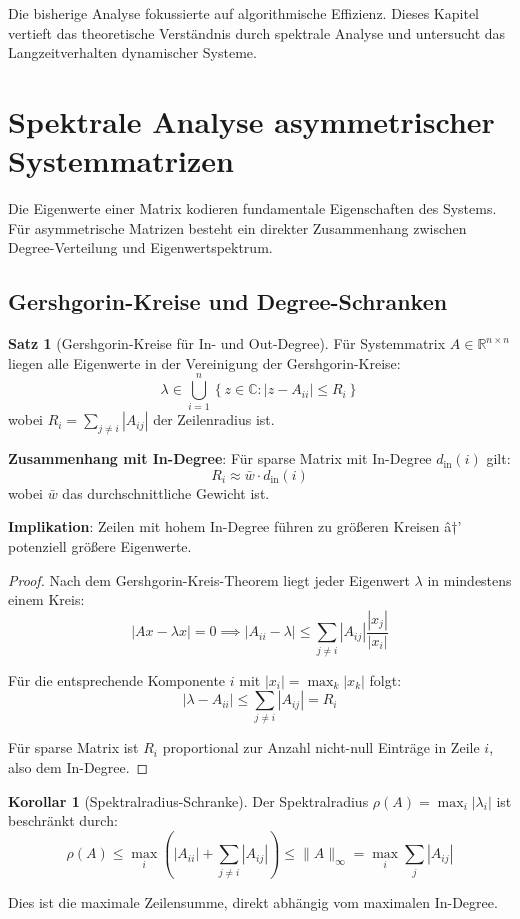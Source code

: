 ﻿\documentclass[a4paper,12pt]{report}
\theoremstyle{definition}
\newtheorem{satz}{Satz}
\newtheorem{korollar}{Korollar}
\begin{document}
	Die bisherige Analyse fokussierte auf algorithmische Effizienz. Dieses Kapitel vertieft das theoretische Verständnis durch spektrale Analyse und untersucht das Langzeitverhalten dynamischer Systeme.
	
	\section{Spektrale Analyse asymmetrischer Systemmatrizen}
	
	Die Eigenwerte einer Matrix kodieren fundamentale Eigenschaften des Systems. Für asymmetrische Matrizen besteht ein direkter Zusammenhang zwischen Degree-Verteilung und Eigenwertspektrum.
	
	\subsection{Gershgorin-Kreise und Degree-Schranken}
	
	\begin{satz}[Gershgorin-Kreise für In- und Out-Degree]
		Für Systemmatrix $A \in \mathbb{R}^{n \times n}$ liegen alle Eigenwerte in der Vereinigung der Gershgorin-Kreise:
		\[
		\lambda \in \bigcup_{i=1}^n \left\{ z \in \mathbb{C} : |z - A_{ii}| \leq R_i \right\}
		\]
		wobei $R_i = \sum_{j \neq i} |A_{ij}|$ der Zeilenradius ist.
		
		\textbf{Zusammenhang mit In-Degree}:
		Für sparse Matrix mit In-Degree $d_{\text{in}}(i)$ gilt:
		\[
		R_i \approx \bar{w} \cdot d_{\text{in}}(i)
		\]
		wobei $\bar{w}$ das durchschnittliche Gewicht ist.
		
		\textbf{Implikation}: Zeilen mit hohem In-Degree führen zu größeren Kreisen â†’ potenziell größere Eigenwerte.
	\end{satz}
	
	\begin{proof}
		Nach dem Gershgorin-Kreis-Theorem liegt jeder Eigenwert $\lambda$ in mindestens einem Kreis:
		\[
		|Ax - \lambda x| = 0 \implies |A_{ii} - \lambda| \leq \sum_{j \neq i} |A_{ij}| \frac{|x_j|}{|x_i|}
		\]
		
		Für die entsprechende Komponente $i$ mit $|x_i| = \max_k |x_k|$ folgt:
		\[
		|\lambda - A_{ii}| \leq \sum_{j \neq i} |A_{ij}| = R_i
		\]
		
		Für sparse Matrix ist $R_i$ proportional zur Anzahl nicht-null Einträge in Zeile $i$, also dem In-Degree.
	\end{proof}
	
	\begin{korollar}[Spektralradius-Schranke]
		Der Spektralradius $\rho(A) = \max_i |\lambda_i|$ ist beschränkt durch:
		\[
		\rho(A) \leq \max_i \left( |A_{ii}| + \sum_{j \neq i} |A_{ij}| \right) \leq \|A\|_{\infty} = \max_i \sum_j |A_{ij}|
		\]
		
		Dies ist die maximale Zeilensumme, direkt abhängig vom maximalen In-Degree.
	\end{korollar}
	
\end{document}
